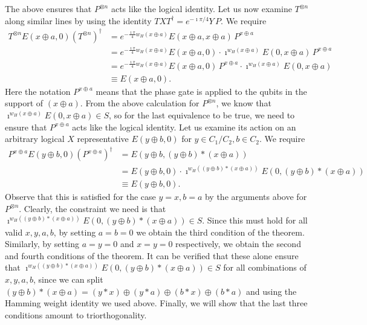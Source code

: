 \documentclass[twoside,romanappendices]{IEEEtran}
\begin{document}
The above ensures that $P^{\otimes n}$ acts like the logical identity.
Let us now examine $T^{\otimes n}$ along similar lines by using the identity $TXT^{\dagger} = e^{-\imath\pi/4} Y\, P$.
We require
\begin{align}
T^{\otimes n} E(x \oplus a, 0) \left( T^{\otimes n} \right)^{\dagger} & = e^{-\frac{\imath\pi}{4} w_H(x \oplus a)} E(x \oplus a, x \oplus a)\, P^{x \oplus a} \\ 
%
  & = e^{-\frac{\imath\pi}{4} w_H(x \oplus a)} E(x \oplus a, 0) \cdot \imath^{w_H(x \oplus a)} E(0, x \oplus a)\, P^{x \oplus a} \\
  & = e^{-\frac{\imath\pi}{4} w_H(x \oplus a)} E(x \oplus a, 0)\, P^{x \oplus a} \cdot \imath^{w_H(x \oplus a)} E(0, x \oplus a)\\
  & \equiv E(x \oplus a, 0).
\end{align}
Here the notation $P^{x \oplus a}$ means that the phase gate is applied to the qubits in the support of $(x \oplus a)$.
From the above calculation for $P^{\otimes n}$, we know that $\imath^{w_H(x \oplus a)} E(0, x \oplus a) \in S$, so for the last equivalence to be true, we need to ensure that $P^{x \oplus a}$ acts like the logical identity.
Let us examine its action on an arbitrary logical $X$ representative $E(y \oplus b, 0)$ for $y \in C_1/C_2, b \in C_2$.
We require
\begin{align}
P^{x \oplus a} E(y \oplus b, 0) \left( P^{x \oplus a} \right)^{\dagger} & = E(y \oplus b, (y \oplus b) \ast (x \oplus a)) \\
% 
  & = E(y \oplus b, 0) \cdot \imath^{w_H((y \oplus b) \ast (x \oplus a))} E(0, (y \oplus b) \ast (x \oplus a)) \\
  & \equiv E(y \oplus b, 0).
\end{align}
Observe that this is satisfied for the case $y = x, b = a$ by the arguments above for $P^{\otimes n}$.
Clearly, the constraint we need is that $\imath^{w_H((y \oplus b) \ast (x \oplus a))} E(0, (y \oplus b) \ast (x \oplus a)) \in S$.
Since this must hold for all valid $x,y,a,b$, by setting $a = b = 0$ we obtain the third condition of the theorem.
Similarly, by setting $a = y = 0$ and $x = y = 0$ respectively, we obtain the second and fourth conditions of the theorem.
It can be verified that these alone ensure that $\imath^{w_H((y \oplus b) \ast (x \oplus a))} E(0, (y \oplus b) \ast (x \oplus a)) \in S$ for all combinations of $x,y,a,b$, since we can split $(y \oplus b) \ast (x \oplus a) = (y \ast x) \oplus (y \ast a) \oplus (b \ast x) \oplus (b \ast a)$ and using the Hamming weight identity we used above.
Finally, we will show that the last three conditions amount to triorthogonality.
\end{document}
